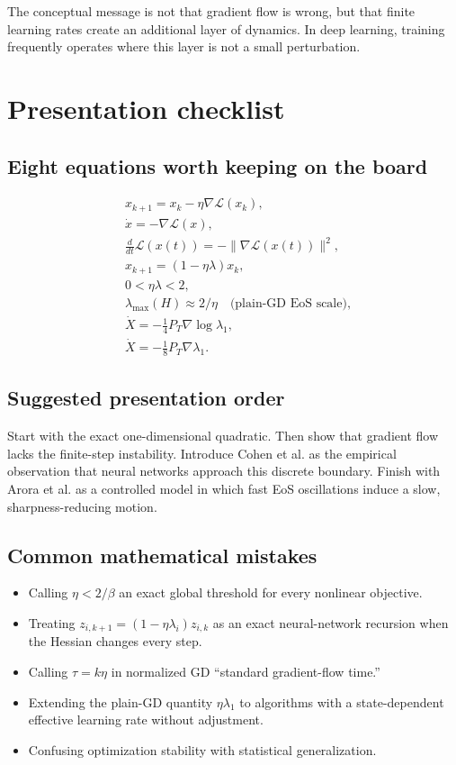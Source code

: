 \documentclass[11pt,a4paper,oneside,openany]{memoir}
\theoremstyle{definition}
\begin{document}
\begin{presentbox}
The conceptual message is not that gradient flow is wrong, but that finite learning rates create an additional layer of dynamics.  In deep learning, training frequently operates where this layer is not a small perturbation.
\end{presentbox}

\chapter{Presentation checklist}

\section{Eight equations worth keeping on the board}
\begin{align*}
&x_{k+1}=x_k-\eta\nabla\mathcal L(x_k),\\
&\dot x=-\nabla\mathcal L(x),\\
&\frac{d}{dt}\mathcal L(x(t))=-\|\nabla\mathcal L(x(t))\|^2,\\
&x_{k+1}=(1-\eta\lambda)x_k,\\
&0<\eta\lambda<2,\\
&\lambda_{\max}(H)\approx 2/\eta\quad\text{(plain-GD EoS scale)},\\
&\dot X=-\frac14P_T\nabla\log\lambda_1,\\
&\dot X=-\frac18P_T\nabla\lambda_1.
\end{align*}

\section{Suggested presentation order}
Start with the exact one-dimensional quadratic.  Then show that gradient flow lacks the finite-step instability.  Introduce Cohen et al. as the empirical observation that neural networks approach this discrete boundary.  Finish with Arora et al. as a controlled model in which fast EoS oscillations induce a slow, sharpness-reducing motion.

\section{Common mathematical mistakes}
\begin{itemize}
\item Calling $\eta<2/\beta$ an exact global threshold for every nonlinear objective.
\item Treating $z_{i,k+1}=(1-\eta\lambda_i)z_{i,k}$ as an exact neural-network recursion when the Hessian changes every step.
\item Calling $\tau=k\eta$ in normalized GD ``standard gradient-flow time.''
\item Extending the plain-GD quantity $\eta\lambda_1$ to algorithms with a state-dependent effective learning rate without adjustment.
\item Confusing optimization stability with statistical generalization.
\end{itemize}
\end{document}
